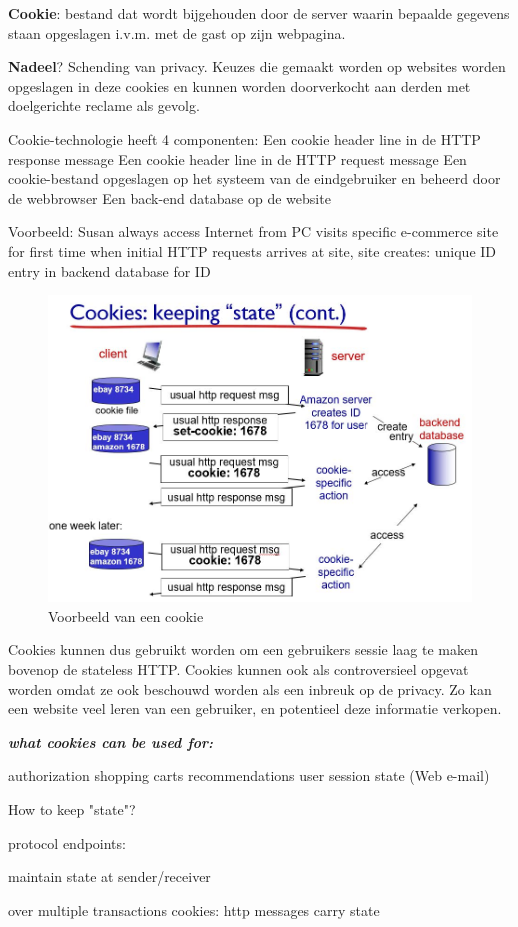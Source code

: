 \noindent \textbf{Cookie}: bestand dat wordt bijgehouden door de server waarin bepaalde gegevens staan opgeslagen i.v.m. met de gast op zijn webpagina.

\noindent \textbf{Nadeel}? Schending van privacy. Keuzes die gemaakt worden op websites worden opgeslagen in deze cookies en kunnen worden doorverkocht aan derden met doelgerichte reclame als gevolg.

\noindent Cookie-technologie heeft 4 componenten:
\be
\itf Een cookie header line in de HTTP response message
\itf Een cookie header line in de HTTP request message
\itf Een cookie-bestand opgeslagen op het systeem van de
eindgebruiker en beheerd door de webbrowser
\itf Een back-end database op de website
\ee

\noindent Voorbeeld:
\be
\itf Susan always access Internet from PC
\itf visits specific e-commerce site for first time
\itf when initial HTTP requests arrives at site, site creates:
\itf unique ID
\itf entry in backend database for ID
\ee

\begin{figure}[h]
    \centering
    \includegraphics[width=4.5in]{./img/imghfdst2/cookie.jpg}
    \caption{Voorbeeld van een cookie }
    \label{fig:cookie}
\end{figure}

\newpage

\noindent Cookies kunnen dus gebruikt worden om een gebruikers sessie laag te maken bovenop de stateless HTTP. Cookies kunnen ook als controversieel opgevat worden omdat ze ook beschouwd worden als een inbreuk op de privacy. Zo kan een website veel leren van een gebruiker, en potentieel deze informatie verkopen.

\begin{multicols}{2}
\noindent \textit{\textbf{what cookies can be used for:}}

\bi
\itf authorization
\itf shopping carts
\itf recommendations
\itf user session state (Web e-mail)
\ei

\noindent How to keep "state"?

\bi
\itf protocol endpoints:

maintain state at sender/receiver

over multiple transactions
\itf cookies: http messages carry state
\ei
\end{multicols}


